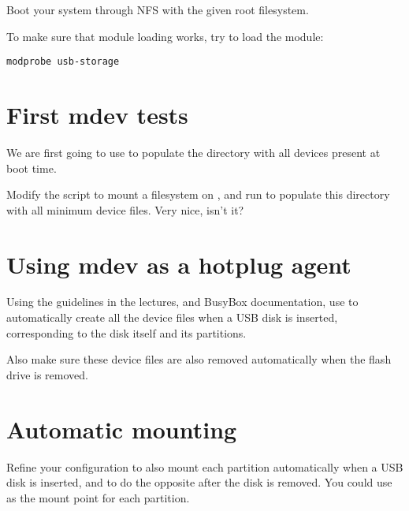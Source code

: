Boot your system through NFS with the given root filesystem.

To make sure that module loading works, try to load the
 module:
\begin{verbatim}
modprobe usb-storage
\end{verbatim}

\section{First mdev tests}

We are first going to use  to populate the 
directory with all devices present at boot time.

Modify the  script to mount a 
filesystem on , and run  to populate this
directory with all minimum device files. Very nice, isn't it?

\section{Using mdev as a hotplug agent}

Using the guidelines in the lectures, and BusyBox documentation, use
 to automatically create all the 
device files when a USB disk is inserted, corresponding to the disk
itself and its partitions.

Also make sure these device files are also removed automatically when
the flash drive is removed.

\section{Automatic mounting}

Refine your configuration to also mount each partition automatically
when a USB disk is inserted, and to do the opposite after the disk is
removed. You could use  as the mount point for
each partition.
